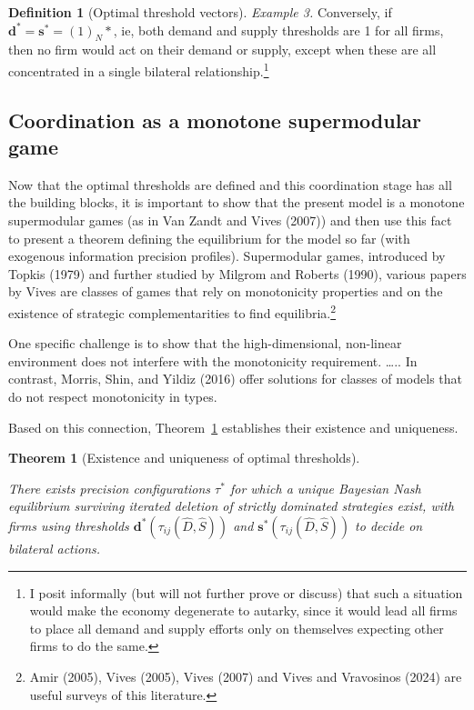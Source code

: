 \documentclass[
]{article}
\theoremstyle{definition}
\newtheorem{definition}{Definition}[section]
\theoremstyle{plain}
\newtheorem{theorem}{Theorem}[section]
\theoremstyle{remark}
\begin{document}
\begin{definition}[Optimal threshold
vectors]
\emph{Example 3.} Conversely, if
\(\mathbf{d}^* = \mathbf{s}^* = (1)_N*\), ie, both demand and supply
thresholds are 1 for all firms, then no firm would act on their demand
or supply, except when these are all concentrated in a single bilateral
relationship.\footnote{I posit informally (but will not further prove or
  discuss) that such a situation would make the economy degenerate to
  autarky, since it would lead all firms to place all demand and supply
  efforts only on themselves expecting other firms to do the same.}

\end{definition}

\subsection{Coordination as a monotone supermodular
game}\label{coordination-as-a-monotone-supermodular-game}

Now that the optimal thresholds are defined and this coordination stage
has all the building blocks, it is important to show that the present
model is a monotone supermodular games (as in Van Zandt and Vives
(2007)) and then use this fact to present a theorem defining the
equilibrium for the model so far (with exogenous information precision
profiles). Supermodular games, introduced by Topkis (1979) and further
studied by Milgrom and Roberts (1990), various papers by Vives are
classes of games that rely on monotonicity properties and on the
existence of strategic complementarities to find equilibria.\footnote{Amir
  (2005), Vives (2005), Vives (2007) and Vives and Vravosinos (2024) are
  useful surveys of this literature.}

One specific challenge is to show that the high-dimensional, non-linear
environment does not interfere with the monotonicity requirement.
\ldots.. In contrast, Morris, Shin, and Yildiz (2016) offer solutions
for classes of models that do not respect monotonicity in types.

Based on this connection, Theorem~\ref{thm-optmthresh} establishes their
existence and uniqueness.

\begin{theorem}[Existence and uniqueness of optimal
thresholds]\protect\hypertarget{thm-optmthresh}{}\label{thm-optmthresh}

There exists precision configurations \(\tau^*\) for which a unique
Bayesian Nash equilibrium surviving iterated deletion of strictly
dominated strategies exist, with firms using thresholds
\(\mathbf{d}^*(\tau_{ij}(\hat{D}, \hat{S}))\) and
\(\mathbf{s}^*(\tau_{ij}(\hat{D}, \hat{S}))\) to decide on bilateral
actions.

\end{theorem}
\end{document}
